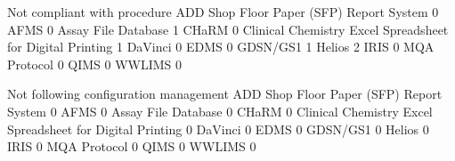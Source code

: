 \documentclass{article}
\begin{document}
\begin{Schunk}
\begin{Soutput}
                                                            Not compliant with procedure
  ADD Shop Floor Paper (SFP) Report System                                             0
  AFMS                                                                                 0
  Assay File Database                                                                  1
  CHaRM                                                                                0
  Clinical Chemistry Excel Spreadsheet for Digital Printing                            1
  DaVinci                                                                              0
  EDMS                                                                                 0
  GDSN/GS1                                                                             1
  Helios                                                                               2
  IRIS                                                                                 0
  MQA Protocol                                                                         0
  QIMS                                                                                 0
  WWLIMS                                                                               0
                                                           
                                                            Not following configuration management
  ADD Shop Floor Paper (SFP) Report System                                                       0
  AFMS                                                                                           0
  Assay File Database                                                                            0
  CHaRM                                                                                          0
  Clinical Chemistry Excel Spreadsheet for Digital Printing                                      0
  DaVinci                                                                                        0
  EDMS                                                                                           0
  GDSN/GS1                                                                                       0
  Helios                                                                                         0
  IRIS                                                                                           0
  MQA Protocol                                                                                   0
  QIMS                                                                                           0
  WWLIMS                                                                                         0
                                                           

\end{Soutput}
\end{Schunk}
\end{document}
